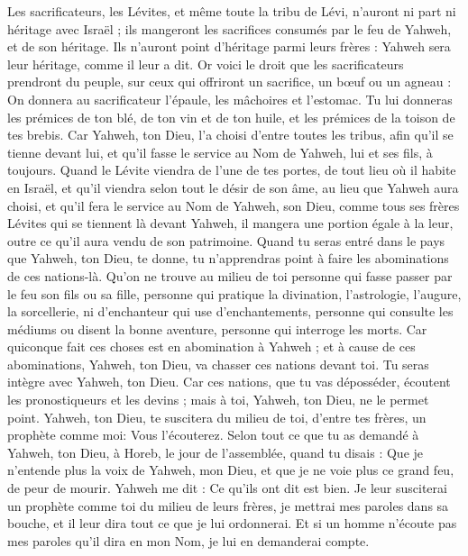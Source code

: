 \begin{multicols}{2}
\VerseOne{}Les sacrificateurs, les Lévites, et même toute la tribu de Lévi, n'auront ni part ni héritage avec Israël ; ils mangeront les sacrifices consumés par le feu de Yahweh, et de son héritage.
Ils n'auront point d'héritage parmi leurs frères : Yahweh sera leur héritage, comme il leur a dit.
Or voici le droit que les sacrificateurs prendront du peuple, sur ceux qui offriront un sacrifice, un bœuf ou un agneau : On donnera au sacrificateur l'épaule, les mâchoires et l’estomac.
Tu lui donneras les prémices de ton blé, de ton vin et de ton huile, et les prémices de la toison de tes brebis.
Car Yahweh, ton Dieu, l’a choisi d'entre toutes les tribus, afin qu'il se tienne devant lui, et qu’il fasse le service au Nom de Yahweh, lui et ses fils, à toujours.
Quand le Lévite viendra de l’une de tes portes, de tout lieu où il habite en Israël, et qu'il viendra selon tout le désir de son âme, au lieu que Yahweh aura choisi,
et qu’il fera le service au Nom de Yahweh, son Dieu, comme tous ses frères Lévites qui se tiennent là devant Yahweh,
il mangera une portion égale à la leur, outre ce qu'il aura vendu de son patrimoine.
Quand tu seras entré dans le pays que Yahweh, ton Dieu, te donne, tu n'apprendras point à faire les abominations de ces nations-là.
Qu’on ne trouve au milieu de toi personne qui fasse passer par le feu son fils ou sa fille, personne qui pratique la divination, l’astrologie, l’augure, la sorcellerie,
ni d'enchanteur qui use d'enchantements, personne qui consulte les médiums ou disent la bonne aventure, personne qui interroge les morts\FTNT{}.
Car quiconque fait ces choses est en abomination à Yahweh ; et à cause de ces abominations, Yahweh, ton Dieu, va chasser ces nations devant toi.
Tu seras intègre avec Yahweh, ton Dieu.
Car ces nations, que tu vas déposséder, écoutent les pronostiqueurs et les devins ; mais à toi, Yahweh, ton Dieu, ne le permet point.
Yahweh, ton Dieu, te suscitera du milieu de toi, d'entre tes frères, un prophète comme moi\FTNT{}: Vous l'écouterez.
Selon tout ce que tu as demandé à Yahweh, ton Dieu, à Horeb, le jour de l'assemblée, quand tu disais : Que je n'entende plus la voix de Yahweh, mon Dieu, et que je ne voie plus ce grand feu, de peur de mourir.
Yahweh me dit : Ce qu’ils ont dit est bien.
Je leur susciterai un prophète comme toi du milieu de leurs frères, je mettrai mes paroles dans sa bouche, et il leur dira tout ce que je lui ordonnerai.
Et si un homme n'écoute pas mes paroles qu’il dira en mon Nom, je lui en demanderai compte.

\end{multicols}
